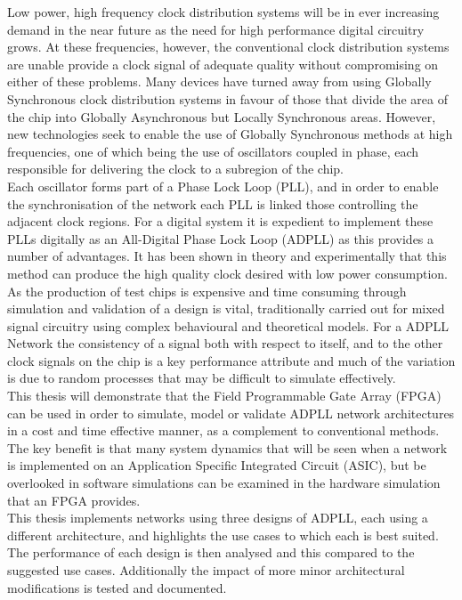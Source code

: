 \documentclass[11pt,english,british]{report}
\begin{document}
Low power, high frequency clock distribution systems will be in ever increasing demand in the near future as the need for high performance digital circuitry grows. At these frequencies, however, the conventional clock distribution systems are unable provide a clock signal of adequate quality without compromising on either of these problems. Many devices have turned away from using Globally Synchronous clock distribution systems in favour of those that divide the area of the chip into Globally Asynchronous but Locally Synchronous areas. However, new technologies seek to enable the use of Globally Synchronous methods at high frequencies, one of which being the use of oscillators coupled in phase, each responsible for delivering the clock to a subregion of the chip.\\
Each oscillator forms part of a Phase Lock Loop (PLL), and in order to enable the synchronisation of the network each PLL is linked those controlling the adjacent clock regions. For a digital system it is expedient to implement these PLLs digitally as an All-Digital Phase Lock Loop (ADPLL) as this provides a number of advantages. It has been shown in theory and experimentally that this method can produce the high quality clock desired with low power consumption.\\
As the production of test chips is expensive and time consuming through simulation and validation of a design is vital, traditionally carried out for mixed signal circuitry using complex behavioural and theoretical models. For a ADPLL Network the consistency of a signal both with respect to itself, and to the other clock signals on the chip is a key performance attribute and much of the variation is due to random processes that may be difficult to simulate effectively.\\
This thesis will demonstrate that the Field Programmable Gate Array (FPGA) can be used in order to simulate, model or validate ADPLL network architectures in a cost and time effective manner, as a complement to conventional methods. The key benefit is that many system dynamics that will be seen when a network is implemented on an Application Specific Integrated Circuit (ASIC), but be overlooked in software simulations can be examined in the hardware simulation that an FPGA provides.\\
This thesis implements networks using three designs of ADPLL, each using a different architecture, and highlights the use cases to which each is best suited. The performance of each design is then analysed and this compared to the suggested use cases. Additionally the impact of more minor architectural modifications is tested and documented.
\end{document}
